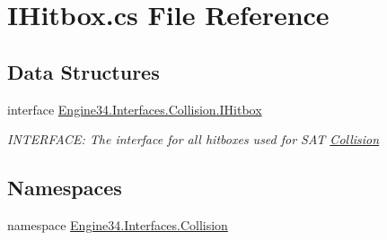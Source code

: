 \hypertarget{a00107}{}\section{I\+Hitbox.\+cs File Reference}
\label{a00107}
\subsection*{Data Structures}
\begin{DoxyCompactItemize}
\item 
interface \hyperlink{a00434}{Engine34.\+Interfaces.\+Collision.\+I\+Hitbox}
\begin{DoxyCompactList}\small\item\em I\+N\+T\+E\+R\+F\+A\+CE\+: The interface for all hitboxes used for S\+AT \hyperlink{a00256}{Collision} \end{DoxyCompactList}\end{DoxyCompactItemize}
\subsection*{Namespaces}
\begin{DoxyCompactItemize}
\item 
namespace \hyperlink{a00256}{Engine34.\+Interfaces.\+Collision}
\end{DoxyCompactItemize}
